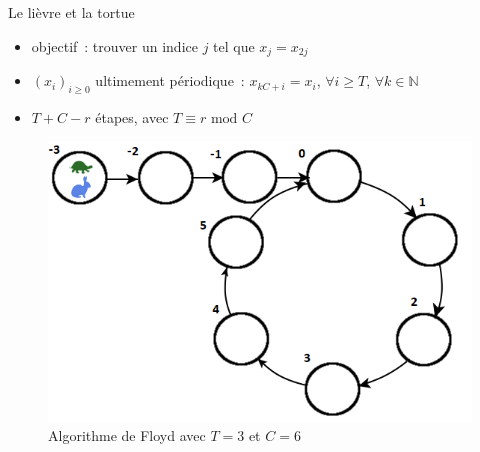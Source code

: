 \documentclass{beamer}
\begin{document}
  \begin{frame}{Le lièvre et la tortue}
    \begin{itemize}
        \item objectif~: trouver un indice $j$ tel que $x_j = x_{2j}$
        \item $(x_i)_{i \ge 0}$ ultimement périodique~: $x_{kC+i} = x_i$, $\forall i \geq T$, $\forall k \in \mathbb{N}$
        \item $T + C - r$ étapes, avec $T \equiv r \text{\ mod } C$
    \end{itemize}
    \begin{figure}
      \center{}
      \includegraphics[scale=0.5]{../rapport/images/Floyd.png}
      \caption{Algorithme de Floyd avec $T = 3$ et $C = 6$}
    \end{figure}
  \end{frame}
\end{document}
